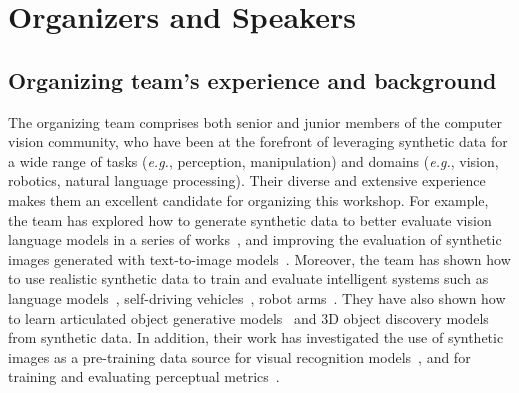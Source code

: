 \documentclass{article}
\begin{document}
\section{Organizers and Speakers}

\subsection{Organizing team’s experience and background}
The organizing team comprises both senior and junior members of the computer vision community, who have been at the forefront of leveraging synthetic data for a wide range of tasks (\emph{e.g.}, perception, manipulation) and domains (\emph{e.g.}, vision, robotics, natural language processing). Their diverse and extensive experience makes them an excellent candidate for organizing this workshop.
For example, the team has explored how to generate synthetic data to better evaluate vision language models in a series of works~\cite{ma2023crepe,hsieh2023sugarcrepe,ray2023cola,zhang2024task}, and improving the evaluation of synthetic images generated with text-to-image models~\cite{hu2023tifa}. Moreover, the team has shown how to use realistic synthetic data to train and evaluate intelligent systems such as language models~\cite{hsieh2023distilling,yu2023large}, self-driving vehicles~\cite{manivasagam2020lidarsim,yang2023unisim}, robot arms~\cite{duan2023ar2,lin2023mira}. They have also shown how to learn articulated object generative models~\cite{luo2024physpart} and 3D object discovery models~\cite{luo2024unsupervised} from synthetic data.
In addition, their work has investigated the use of synthetic images as a pre-training data source for visual recognition models~\cite{baradad2022procedural,jahanian2022generative,tian2023stablerep}, and for training and evaluating perceptual metrics~\cite{fu2023dreamsim}.
\end{document}
